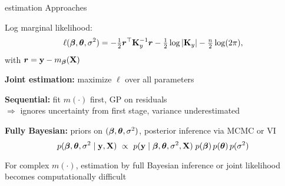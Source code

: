 \documentclass[11pt,compress,t,notes=noshow, xcolor=table]{beamer}
\begin{document}



\begin{framei}[sep=L]{estimation Approaches }
\item Log marginal likelihood:
$$\ell(\bm{\beta},\bm{\theta},\sigma^2) = -\tfrac{1}{2}\bm{r}^\top \mathbf{K}_y^{-1}\bm{r}
-\tfrac{1}{2}\log|\mathbf{K}_y| - \tfrac{n}{2}\log(2\pi),$$
with $\bm{r}=\mathbf{y} - m_{\bm{\beta}}(\mathbf{X})$
\item \textbf{Joint estimation:} maximize $\ell$ over all parameters 
\item \textbf{Sequential:} fit $m(\cdot)$ first, GP on residuals \\
\hspace*{1em}$\Rightarrow$ ignores uncertainty from first stage, variance underestimated
\item \textbf{Fully Bayesian:} priors on $(\bm{\beta},\bm{\theta},\sigma^2)$, posterior inference via MCMC or VI
$$p(\bm{\beta},\thetav,\sigma^2 \mid \yv,\Xmat)\ \propto\ 
p(\yv \mid \bm{\beta},\thetav,\sigma^2,\Xmat)\;
p(\bm{\beta})\,p(\thetav)\,p(\sigma^2)$$
\item For complex $m(\cdot)$, estimation by full Bayesian inference or joint likelihood becomes computationally difficult
\end{framei}

\end{document}
